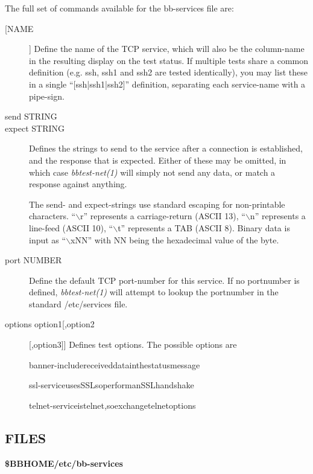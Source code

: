   The full set of commands available for the bb-services file are: 


 \begin{description}
\item[[NAME]] Define the name of the TCP service, which will also be the column-name in the resulting display on the test status. If multiple tests share a common definition (e.g. ssh, ssh1 and ssh2 are tested identically), you may list these in a single ``[ssh|ssh1|ssh2]'' definition, separating each service-name with a pipe-sign. 

 

\item[send STRING]
\item[expect STRING] Defines the strings to send to the service after a connection is established, and the response that is expected. Either of these may be omitted, in which case \emph{bbtest-net(1)}
 will simply not send any data, or match a response against anything. 

  The send- and expect-strings use standard escaping for non-printable characters. ``$\backslash$r'' represents a carriage-return (ASCII 13), ``$\backslash$n'' represents a line-feed (ASCII 10), ``$\backslash$t'' represents a TAB (ASCII 8). Binary data is input as ``$\backslash$xNN'' with NN being the hexadecimal value of the byte. 


 

\item[port NUMBER] Define the default TCP port-number for this service. If no portnumber is defined, \emph{bbtest-net(1)}
 will attempt to lookup the portnumber in the standard /etc/services file. 

 

\item[options option1[,option2][,option3]] Defines test options. The possible options are  
 
banner-includereceiveddatainthestatusmessage  
 
ssl-serviceusesSSLsoperformanSSLhandshake  
 
telnet-serviceistelnet,soexchangetelnetoptions 

 


 


\end{description}

\subsection{FILES}
\textbf{\$BBHOME/etc/bb-services}


